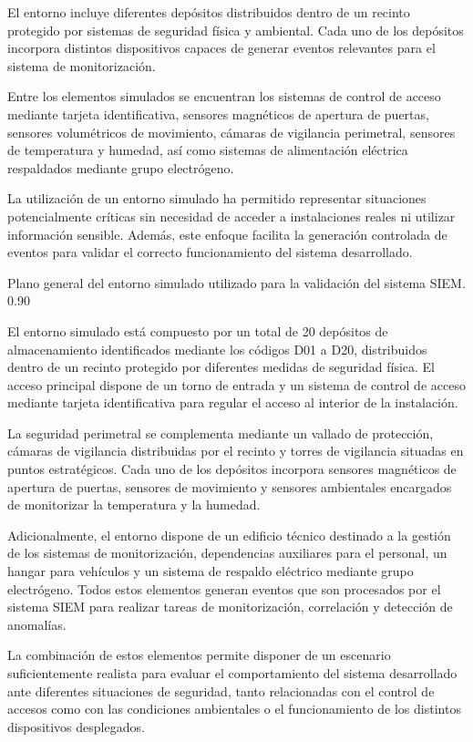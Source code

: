 El entorno incluye diferentes depósitos distribuidos dentro de un recinto protegido por sistemas de seguridad física y ambiental. Cada uno de los depósitos incorpora distintos dispositivos capaces de generar eventos relevantes para el sistema de monitorización.

Entre los elementos simulados se encuentran los sistemas de control de acceso mediante tarjeta identificativa, sensores magnéticos de apertura de puertas, sensores volumétricos de movimiento, cámaras de vigilancia perimetral, sensores de temperatura y humedad, así como sistemas de alimentación eléctrica respaldados mediante grupo electrógeno.

La utilización de un entorno simulado ha permitido representar situaciones potencialmente críticas sin necesidad de acceder a instalaciones reales ni utilizar información sensible. Además, este enfoque facilita la generación controlada de eventos para validar el correcto funcionamiento del sistema desarrollado.

{Plano general del entorno simulado utilizado para la validación del sistema SIEM.}
{0.90}

El entorno simulado está compuesto por un total de 20 depósitos de almacenamiento identificados mediante los códigos D01 a D20, distribuidos dentro de un recinto protegido por diferentes medidas de seguridad física. El acceso principal dispone de un torno de entrada y un sistema de control de acceso mediante tarjeta identificativa para regular el acceso al interior de la instalación.

La seguridad perimetral se complementa mediante un vallado de protección, cámaras de vigilancia distribuidas por el recinto y torres de vigilancia situadas en puntos estratégicos. Cada uno de los depósitos incorpora sensores magnéticos de apertura de puertas, sensores de movimiento y sensores ambientales encargados de monitorizar la temperatura y la humedad.

Adicionalmente, el entorno dispone de un edificio técnico destinado a la gestión de los sistemas de monitorización, dependencias auxiliares para el personal, un hangar para vehículos y un sistema de respaldo eléctrico mediante grupo electrógeno. Todos estos elementos generan eventos que son procesados por el sistema SIEM para realizar tareas de monitorización, correlación y detección de anomalías.

La combinación de estos elementos permite disponer de un escenario suficientemente realista para evaluar el comportamiento del sistema desarrollado ante diferentes situaciones de seguridad, tanto relacionadas con el control de accesos como con las condiciones ambientales o el funcionamiento de los distintos dispositivos desplegados.

